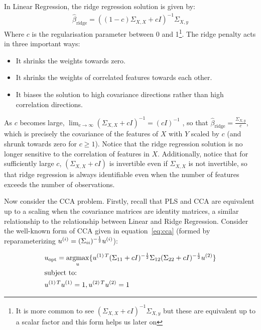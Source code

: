 In Linear Regression, the ridge regression solution is given by:
\begin{align}
    \hat{\beta}_{\text{ridge}} = ((1-c)\Sigma_{X,X} + c I)^{-1} \Sigma_{X,y}
\end{align}
Where \(c\) is the regularisation parameter between 0 and 1\footnote{It is more common to see $(\Sigma_{X,X} + c I)^{-1} \Sigma_{X,y}$ but these are equivalent up to a scalar factor and this form helps us later on}.
The ridge penalty acts in three important ways:
\begin{itemize}
    \item It shrinks the \gls{weights} towards zero.
    \item It shrinks the \gls{weights} of correlated features towards each other.
    \item It biases the solution to high covariance directions rather than high correlation directions.
\end{itemize}

As $c$ becomes large, $\lim_{c \to \infty} (\Sigma_{X,X} + c I)^{-1} = (c I)^{-1}$
, so that $\hat{\beta}_{\text{ridge}}=\frac{\Sigma_{X,y}}{c}$, which is precisely the covariance of the features of $X$ with $Y$ scaled by $c$ (and shrunk towards zero for $c \geq 1$).
Notice that the ridge regression solution is no longer sensitive to the correlation of features in $X$.
Additionally, notice that for sufficiently large $c$, $(\Sigma_{X,X} + c I)$ is invertible even if $\Sigma_{X,X}$ is not invertible, so that ridge regression is always identifiable even when the number of features exceeds the number of observations.

Now consider the CCA problem.
Firstly, recall that PLS and CCA are equivalent up to a scaling when the covariance matrices are identity matrices, a similar relationship to the relationship between Linear and Ridge Regression.
Consider the well-known form of CCA given in equation~\ref{eq:cca}\citep{mihalik2022canonical} (formed by reparameterizing \(u^{(i)}=(\Sigma_{ii})^{-\frac{1}{2}}u^{(i)}\)):

\begin{align}
    \label{eq:cca}
    & u_{\text{opt}}=\underset{u}{\mathrm{argmax}}\{ u^{(1)\,T}(\Sigma_{11}+ c I)^{-\frac{1}{2}}\Sigma_{12}(\Sigma_{22}+c I)^{-\frac{1}{2}}u^{(2)} \} \\
    & \text{subject to:} \notag \\
    & u^{(1)\,T}u^{(1)}=1, u^{(2)\,T}u^{(2)}=1 \notag
\end{align}

